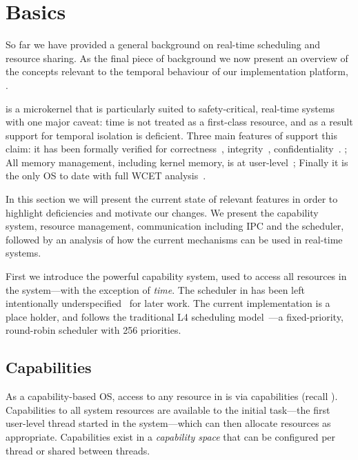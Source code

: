 

\chapter{\selfour Basics}
\label{chap:sel4}

So far we have provided a general background on real-time scheduling and resource sharing.
As the final piece of background we now present an overview of the concepts relevant to the temporal behaviour of our implementation platform, \selfour.

\selfour is a microkernel that is particularly suited to safety-critical, real-time systems
with one major caveat: time is not treated as a first-class resource, and as a result support for
temporal isolation is deficient. Three main features of \selfour
support this claim: it has been formally verified for correctness~\citep{Klein_EHACDEEKNSTW_09,
Klein_AEMSKH_14}, integrity~\citep{Sewell_WGMAK_11}, confidentiality~\citep{Murray_MBGBSLGK_13}.
; All memory management, including kernel memory, is at
user-level~\citep{Elkaduwe_Derrin_06}; Finally it is the only \gls{OS} to date with full \gls{WCET}
analysis~\citep{Sewell_KH_16}.  

In this section we will present the current state of relevant \selfour features in order to
highlight deficiencies and motivate our changes.  We present the capability system, resource
management, communication including \gls{IPC} and the scheduler, followed by an analysis of
how the current mechanisms can be used in real-time systems.

First we introduce the powerful \selfour capability system, used to access all resources in the
system---with the exception of \emph{time}. The scheduler in \selfour has been left intentionally
underspecified~\citep{Petters_EH_12} for later work.  The current implementation is a place holder,
and follows the traditional L4 scheduling model~\citep{Ruocco_06}---a fixed-priority, round-robin
scheduler with 256 priorities. 


\section{Capabilities}
\label{s:capabilities}

As a capability-based \gls{OS}, access to any resource in \selfour is via capabilities (recall
). Capabilities to all system resources are available to the initial task---the first
user-level thread started in the system---which can then allocate resources as appropriate.
Capabilities exist in a \emph{capability space} that can be configured per thread or shared between
threads. 

